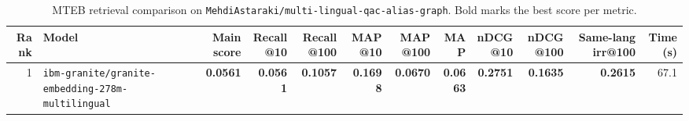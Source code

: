\begin{table}[t]
\centering
\small
\begin{tabular}{r l r r r r r r r r r r}
\hline
Rank & Model & Main score & Recall@10 & Recall@100 & MAP@10 & MAP@100 & MAP & nDCG@10 & nDCG@100 & Same-lang irr@100 & Time (s) \\
\hline
1 & \texttt{ibm-granite/granite-embedding-278m-multilingual} & \textbf{0.0561} & \textbf{0.0561} & \textbf{0.1057} & \textbf{0.1698} & \textbf{0.0670} & \textbf{0.0663} & \textbf{0.2751} & \textbf{0.1635} & \textbf{0.2615} & 67.1 \\
\hline
\end{tabular}
\caption{MTEB retrieval comparison on \texttt{MehdiAstaraki/multi-lingual-qac-alias-graph}. Bold marks the best score per metric.}
\label{tab:mteb-model-comparison}
\end{table}
